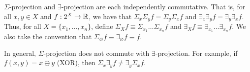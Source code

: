 
$\Sigma$-projection and $\exists$-projection are each independently commutative. 
That is, for all $x, y \in X$ and $f: 2^X \to \mathbb{R}$, we have that $\Sigma_x \Sigma_y f = \Sigma_y \Sigma_x f$ and $\exists_x \exists_y f = \exists_y \exists_x f$. 
Thus, for all $X = \{x_1, \ldots, x_n\}$, define $\Sigma_X f \equiv \Sigma_{x_1} \ldots \Sigma_{x_n} f$ and $\exists_X f \equiv \exists_{x_1} \ldots \exists_{x_n} f$. 
We also take the convention that $\Sigma_\varnothing f \equiv \exists_\varnothing f \equiv f$.

In general, $\Sigma$-projection does not commute with $\exists$-projection. For example, if $f(x, y) = x \oplus y$ (XOR), then $\Sigma_x \exists_y f \neq \exists_y \Sigma_x f$.
